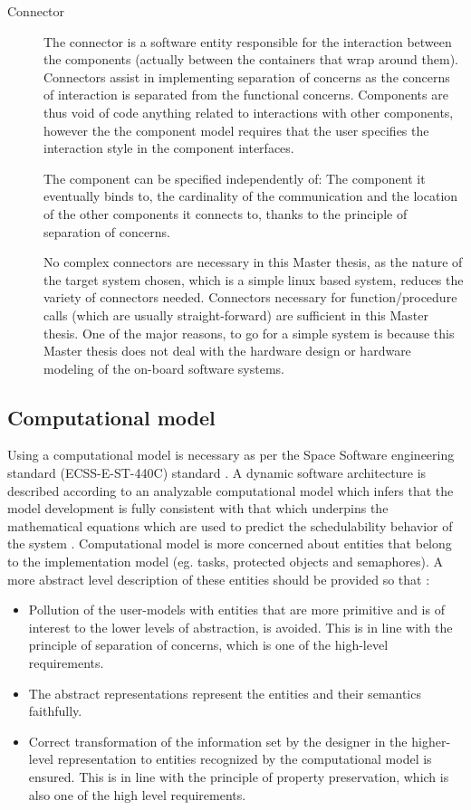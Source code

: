 \begin{description}
\item [Connector] The connector is a software entity responsible for the interaction between the components (actually between the containers that wrap around them). Connectors assist in implementing separation of concerns as the concerns of interaction is separated from the functional concerns. Components are thus void of code anything related to interactions with other components, however the the component model requires that the user specifies the interaction style in the component interfaces.

The component can be specified independently of: The component it eventually binds to, the cardinality of the communication and the location of the other components it connects to, thanks to the principle of separation of concerns. 

No complex connectors are necessary in this Master thesis, as the nature of the target system chosen, which is a simple linux based system, reduces the variety of connectors needed. Connectors necessary for function/procedure calls (which are usually straight-forward) are sufficient in this Master thesis. One of the major reasons, to go for a simple system is because this Master thesis does not deal with the hardware design or hardware modeling of the on-board software systems.           
\end{description} 

\subsection{Computational model}
\label{section: Computational model} 
Using a computational model is necessary as per the Space Software engineering standard (ECSS-E-ST-440C) standard \cite{SAVOIR}. A dynamic software architecture is described according to an analyzable computational model which infers that the model development is fully consistent with that which underpins the mathematical equations which are used to predict the schedulability behavior of the system \cite{ScheduAnaly}. Computational model is more concerned about entities that belong to the implementation model (eg. tasks, protected objects and semaphores). A more abstract level description of these entities should be provided so that \cite{SAVOIR}:

\begin{itemize}
\item Pollution of the user-models with entities that are more primitive and is of interest to the lower levels of abstraction, is avoided. This is in line with the principle of separation of concerns, which is one of the high-level requirements.

\item The abstract representations represent the entities and their semantics faithfully.

\item Correct transformation of the information set by the designer in the higher-level representation to entities recognized by the computational model is ensured. This is in line with the principle of property preservation, which is also one of the high level requirements. 
\end{itemize} 

